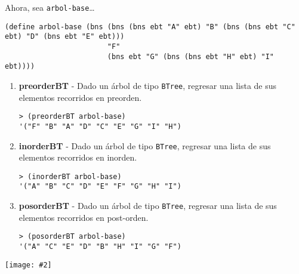 \documentclass{article}
\newcommand{\jimage}[2]{\texttt{[image: \#2]}\vskip10pt}
\begin{document}
\newpage
\item  Ahora, sea \verb;arbol-base;\dots
\begin{verbatim}
(define arbol-base (bns (bns (bns ebt "A" ebt) "B" (bns (bns ebt "C" ebt) "D" (bns ebt "E" ebt))) 
                        "F"
                        (bns ebt "G" (bns (bns ebt "H" ebt) "I" ebt))))
\end{verbatim}

\begin{enumerate}
\item  \textbf{preorderBT} - Dado un árbol de tipo \verb;BTree;, regresar una lista de sus elementos recorridos en preorden.
\begin{verbatim}
> (preorderBT arbol-base)
'("F" "B" "A" "D" "C" "E" "G" "I" "H")
\end{verbatim}

\item  \textbf{inorderBT}  - Dado un árbol de tipo \verb;BTree;, regresar una lista de sus elementos recorridos en inorden.
\begin{verbatim}
> (inorderBT arbol-base)
'("A" "B" "C" "D" "E" "F" "G" "H" "I")
\end{verbatim}

\item \textbf{posorderBT} - Dado un árbol de tipo \verb;BTree;, regresar una lista de sus elementos recorridos en post-orden.
\begin{verbatim}
> (posorderBT arbol-base)
'("A" "C" "E" "D" "B" "H" "I" "G" "F")
\end{verbatim}
   
\end{enumerate}

\jimage{0.8}{imgs/orders.png}
\end{document}
